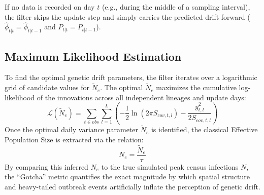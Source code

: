 \documentclass[12pt]{article}
\begin{document}
If no data is recorded on day $t$ (e.g., during the middle of a sampling interval), the filter skips the update step and simply carries the predicted drift forward ($\hat{\phi}_{t|t} = \hat{\phi}_{t|t-1}$ and $P_{t|t} = P_{t|t-1}$).

\subsection{Maximum Likelihood Estimation}
To find the optimal genetic drift parameters, the filter iterates over a logarithmic grid of candidate values for $\tilde{N}_e$. The optimal $\tilde{N}_e$ maximizes the cumulative log-likelihood of the innovations across all independent lineages and update days:
\begin{equation}
    \mathcal{L}(\tilde{N}_e) = \sum_{t \in obs} \sum_{l=1}^{L} \left( -\frac{1}{2} \ln(2 \pi S_{cov, t, l}) - \frac{y_{t, l}^2}{2 S_{cov, t, l}} \right)
\end{equation}
Once the optimal daily variance parameter $\tilde{N}_e$ is identified, the classical Effective Population Size is extracted via the relation:
\begin{equation}
    N_e = \frac{\tilde{N}_e}{\tau}
\end{equation}
By comparing this inferred $N_e$ to the true simulated peak census infections $N$, the ``Gotcha'' metric quantifies the exact magnitude by which spatial structure and heavy-tailed outbreak events artificially inflate the perception of genetic drift.
\end{document}
